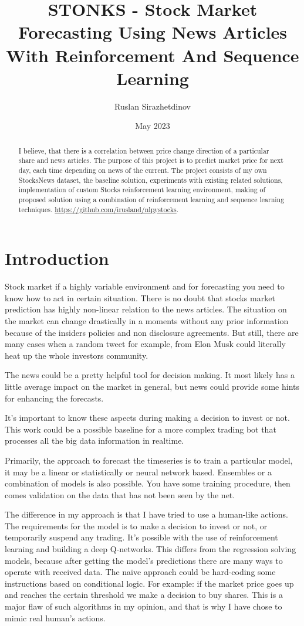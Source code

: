 \documentclass{article}
\title{STONKS - Stock Market Forecasting Using News Articles With Reinforcement And Sequence Learning}
\author{Ruslan Sirazhetdinov}
\date{May 2023}
\begin{document}
\maketitle
\begin{abstract}
    I believe, that there is a correlation between price change direction of a particular share and news articles. The purpose of this project is to predict market price for next day, each time depending on news of the current. The project consists of my own StocksNews dataset, the baseline solution, experiments with existing related solutions, implementation of custom Stocks reinforcement learning environment, making of proposed solution using a combination of reinforcement learning and sequence learning techniques.
    \url{https://github.com/irusland/nlpystocks}.
\end{abstract}



\section{Introduction}
Stock market if a highly variable environment and for forecasting you need to know how to act in certain situation. 
There is no doubt that stocks market prediction has highly non-linear relation to the news articles. The situation on the market can change drastically in a moments without any prior information because of the insiders policies and non disclosure agreements. But still, there are many cases when a random tweet for example, from Elon Musk could literally heat up the whole investors community.

The news could be a pretty helpful tool for decision making. 
It most likely has a little average impact on the market in general, but news could provide some hints for enhancing the forecasts.

It's important to know these aspects during making a decision to invest or not. This work could be a possible baseline for a more complex trading bot that processes all the big data information in realtime.

Primarily, the approach to forecast the timeseries is to train a particular model, it may be a linear or statistically or neural network based. Ensembles or a combination of models is also possible. You have some training procedure, then comes validation on the data that has not been seen by the net.

The difference in my approach is that I have tried to use a human-like actions.
The requirements for the model is to make a decision to invest or not, or temporarily suspend any trading.
It's possible with the use of reinforcement learning and building a deep Q-networks.
This differs from the regression solving models, because after getting the model's predictions there are many ways to operate with received data. The naive approach could be hard-coding some instructions based on conditional logic. For example: if the market price goes up and reaches the certain threshold we make a decision to buy shares. 
This is a major flaw of such algorithms in my opinion, and that is why I have chose to mimic real human's actions.
\end{document}
